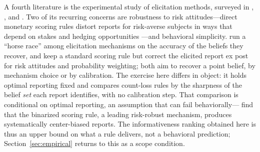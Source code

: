 A fourth literature is the experimental study of elicitation methods, surveyed in \citet{SchlagEtAl2013}, \citet{SchotterTrevino2014}, and \citet{CharnessGneezyRasocha2021}.
Two of its recurring concerns are robustness to risk attitudes---direct monetary scoring rules distort reports for risk-averse subjects in ways that depend on stakes and hedging opportunities \citep{ArmantierTreich2012}---and behavioral simplicity.
\citet{TrautmannVanDeKuilen2015} run a ``horse race'' among elicitation mechanisms on the accuracy of the beliefs they recover, and \citet{Offerman2009} keep a standard scoring rule but correct the elicited report ex post for risk attitudes and probability weighting; both aim to recover a point belief, by mechanism choice or by calibration.
The exercise here differs in object: it holds optimal reporting fixed and compares count-loss rules by the sharpness of the belief \emph{set} each report identifies, with no calibration step.
That comparison is conditional on optimal reporting, an assumption that can fail behaviorally---\citet{DanzVesterlundWilson2022} find that the binarized scoring rule, a leading risk-robust mechanism, produces systematically center-biased reports.
The informativeness ranking obtained here is thus an upper bound on what a rule delivers, not a behavioral prediction; Section~\ref{sec:empirical} returns to this as a scope condition.
